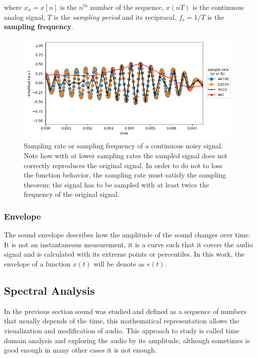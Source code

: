 where $x_n=x[n]$ is the $n^{th}$ number of the sequence, $x(nT)$ is the continuous analog signal, $T$ is the \textit{sampling period} and its reciprocal, $f_s=1/T$ is the \textbf{sampling frequency}. 

\begin{figure}[ht]
    \centering
    \includegraphics[width=\linewidth]{Images/fs.png}
    \caption{Sampling rate or sampling frequency of a continuous noisy signal. Note how with at lower sampling rates the sampled signal does not correctly reproduces the original signal. In order to do not to loss the function behavior, the sampling rate must satisfy the sampling theorem: the signal has to be sampled with at least twice the frequency of the original signal.}
    \label{fig:sampling_rate}
\end{figure}


\subsubsection{Envelope}

The sound envelope describes how the amplitude of the sound changes over time. It is not an instantaneous measurement, it is a curve such that it covers the audio signal and is calculated with its extreme points or percentiles. In this work, the envelope of a function $x(t)$ will be denote as $e(t)$. 


\subsection{Spectral Analysis}

In the previous section sound was studied and defined as a sequence of numbers that usually depends of the time, this mathematical representation allows the visualization and modification of audio. This approach to study  is called time domain analysis and exploring the audio by its amplitude, although sometimes is good enough in many other cases it is not enough. \\

